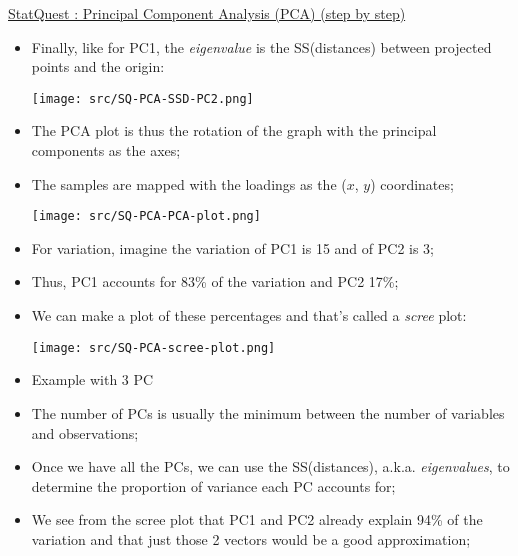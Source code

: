 \documentclass[12pt, titlepage, french]{report}
\begin{document}
\begin{YTB_SUMM}{\href{https://www.youtube.com/watch?v=FgakZw6K1QQ}{StatQuest : Principal Component Analysis (PCA) (step by step)}}
\begin{itemize}
	is that gene 2 is 4 times more important than gene 1;
	\item	Finally, like for PC1, the \textit{eigenvalue} is the SS(distances) between projected points and the origin:
	
	\texttt{[image: src/SQ-PCA-SSD-PC2.png]}
	\item	The PCA plot is thus the rotation of the graph with the principal components as the axes;
	\item[]	The samples are mapped with the loadings as the ($x$, $y$) coordinates;
	
	\texttt{[image: src/SQ-PCA-PCA-plot.png]}
	
	\item	For variation, imagine the variation of PC1 is 15 and of PC2 is 3;
	\item[]	Thus, PC1 accounts for 83\% of the variation and PC2 17\%;
	\item	We can make a plot of these percentages and that's called a \textit{scree} plot:
	
	\texttt{[image: src/SQ-PCA-scree-plot.png]}
	\item	Example with 3 PC
	\item	The number of PCs is usually the minimum between the number of variables and observations;
	\item	Once we have all the PCs, we can use the SS(distances), a.k.a. \textit{eigenvalues}, to determine the proportion of variance each PC accounts for;
	\item	We see from the scree plot that PC1 and PC2 already explain 94\% of the variation and that just those 2 vectors would be a good approximation;
\end{itemize}
\end{YTB_SUMM}
\end{document}
